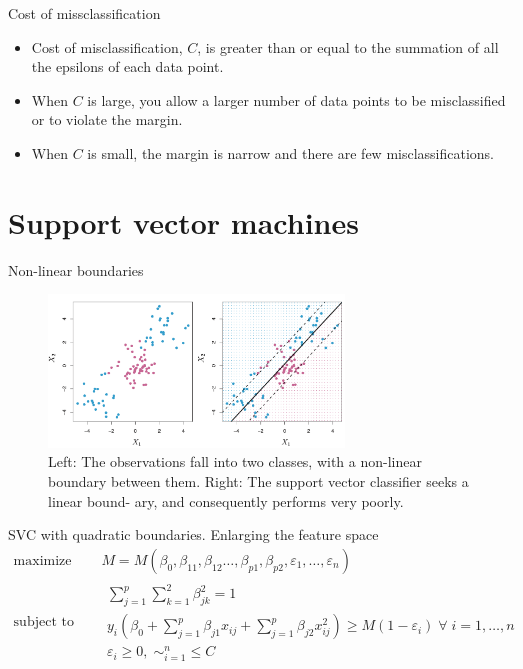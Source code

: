 \documentclass{beamer}
\begin{document}
\begin{frame}{Cost of missclassification}
  \begin{itemize}
    \item Cost of misclassification, $C$, is greater than or equal to the summation of all the epsilons of each data point.
    \item When $C$ is large, you allow a larger number of data points to be misclassified or to violate the margin.
    \item When $C$ is small, the margin is narrow and there are few misclassifications.
  \end{itemize}
\end{frame}

\section{Support vector machines}

\begin{frame}{Non-linear boundaries}
  \begin{figure}
    \includegraphics[width=0.7\textwidth]{nonlinearSVC}
    \caption{Left: The observations fall into two classes, with a non-linear boundary between them. Right: The support vector classifier seeks a linear bound- ary, and consequently performs very poorly\cite{sohil_introduction_2022}.}
  \end{figure}
\end{frame}

\begin{frame}{SVC with quadratic boundaries. Enlarging the feature space}
  \begin{equation*}
    \begin{aligned}
      \text{maximize } \quad & M=M(\beta_0,\beta_{11},\beta_{12}\ldots,\beta_{p1},\beta_{p2},\varepsilon_1,\ldots,\varepsilon_n) \\
      \text{subject to }\quad &
      \begin{array}{l}
        \sum_{j=1}^p \sum_{k=1}^2 \beta_{jk}^2 =1 \\
        y_i(\beta_0+\sum_{j=1}^{p}\beta_{j1}x_{ij}+\sum_{j=1}^{p} \beta_{j2} x_{ij}^2)\geq M(1-\varepsilon_i) \; \forall \; i=1,\ldots,n\\
        \varepsilon_i\geq 0, \; \sim_{i=1}^n\leq C
      \end{array}
    \end{aligned}
  \end{equation*}
\end{frame}
\end{document}
